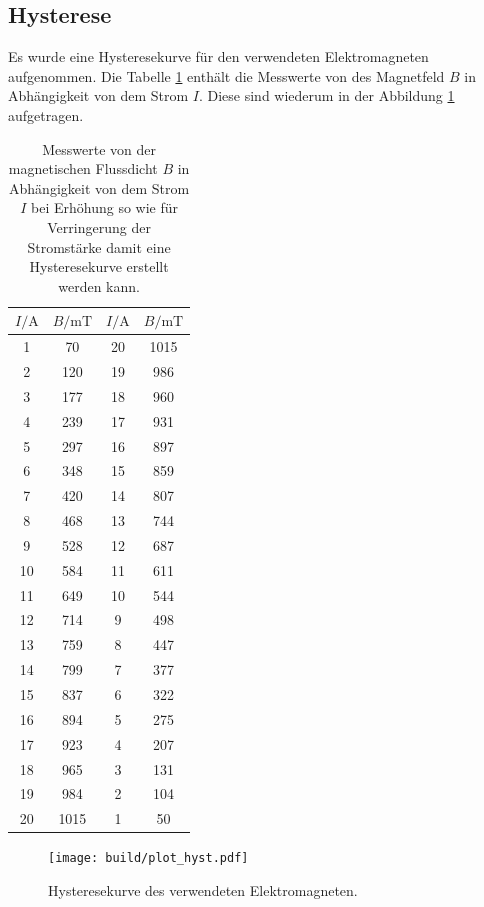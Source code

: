\subsection{Hysterese}
Es wurde eine Hysteresekurve für den verwendeten Elektromagneten aufgenommen.
Die Tabelle \ref{tab:hyst} enthält die Messwerte von des Magnetfeld $B$
in Abhängigkeit von dem  Strom $I$. Diese sind wiederum
in der Abbildung \ref{fig:hyst} aufgetragen.
\begin{table}
  \centering
  \caption{Messwerte von der magnetischen Flussdicht $B$ in Abhängigkeit von dem Strom $I$ bei Erhöhung so wie für Verringerung der Stromstärke damit eine Hysteresekurve erstellt werden kann.}
  \label{tab:hyst}
\begin{tabular}{c c | c c}
  \toprule
 $I/\si{\ampere}$  & $B/\si{\milli\tesla}$  & $I/\si{\ampere}$ & $B/\si{\milli\tesla}$ \\
  \midrule
  1   &  70  &  20  &  1015 \\
  2   &  120 &  19  &   986 \\
  3   &  177 &  18  &   960 \\
  4   &  239 &  17  &   931 \\
  5   &  297 &  16  &   897 \\
  6   &  348 &  15  &   859 \\
  7   &  420 &  14  &   807 \\
  8   &  468 &  13  &   744 \\
  9   &  528 &  12  &   687 \\
  10  &  584 &  11  &   611 \\
  11  &  649 &  10  &   544 \\
  12  &  714 &   9  &   498 \\
  13  &  759 &  8   &   447 \\
  14  &  799 &  7   &   377 \\
  15  &  837 &  6   &   322 \\
  16  &  894 &  5   &   275 \\
  17  &  923 &  4   &   207 \\
  18  &  965 &  3   &   131 \\
  19  &  984 &  2   &   104 \\
  20  &  1015 &  1   &    50 \\
  \bottomrule
\end{tabular}
\end{table}


\begin{figure}
   \centering
   \texttt{[image: build/plot\_hyst.pdf]}
   \caption{Hysteresekurve des verwendeten Elektromagneten.}
   \label{fig:hyst}
 \end{figure}

